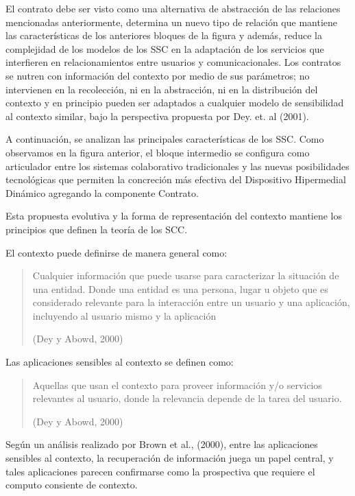 El contrato debe ser visto como una alternativa de abstracción de las relaciones
mencionadas anteriormente, determina un nuevo tipo de relación que mantiene las
características de los anteriores bloques de la figura y además, reduce la
complejidad de
los modelos de los SSC en la adaptación de los servicios que interfieren
en
relacionamientos entre usuarios y comunicacionales. Los contratos se nutren con
información del contexto por medio de sus parámetros; no intervienen en la
recolección,
ni en la abstracción, ni en la distribución del contexto y en principio pueden
ser
adaptados a cualquier modelo de sensibilidad al contexto similar, bajo la
perspectiva propuesta por Dey. et. al (2001).


A continuación, se analizan las principales características de los
SSC.
Como observamos en la figura anterior, el bloque intermedio se configura como
articulador entre los sistemas colaborativo tradicionales y las
nuevas posibilidades
tecnológicas que permiten la concreción más efectiva del Dispositivo
Hipermedial
Dinámico agregando la componente Contrato.

Esta propuesta evolutiva y la forma de representación del contexto mantiene
los principios que definen la teoría de los SCC.

El contexto puede definirse de manera general como:

\begin{quote}
Cualquier información que puede usarse para caracterizar la situación de
una entidad. Donde una entidad es una persona, lugar u objeto que es
considerado relevante para la interacción entre un usuario y una
aplicación, incluyendo al usuario mismo y la aplicación
\begin{flushright}(Dey y Abowd, 2000)\end{flushright}
\end{quote}  


Las aplicaciones sensibles al contexto se definen  como:


\begin{quote}
Aquellas que usan el contexto para proveer información y/o servicios
relevantes al usuario, donde la relevancia depende de la tarea del usuario.
\begin{flushright}(Dey y Abowd, 2000)\end{flushright}
\end{quote}

Según un análisis realizado por Brown et al., (2000), entre las aplicaciones
sensibles al contexto, la recuperación de información juega un papel
central, y
tales aplicaciones parecen confirmarse como la prospectiva que requiere el
computo consiente de contexto.

